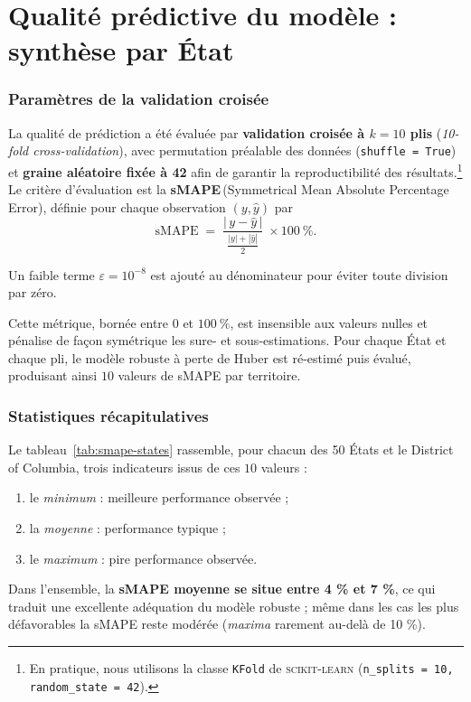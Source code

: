 \section{Qualité prédictive du modèle : synthèse par État}

\subsubsection*{Paramètres de la validation croisée}
La qualité de prédiction a été évaluée par \textbf{validation croisée à $k=10$ plis}
(\emph{10-fold cross-validation}), avec permutation préalable des données
(\texttt{shuffle = True}) et \textbf{graine aléatoire fixée à 42} afin de garantir la
reproductibilité des résultats.\footnote{En pratique, nous utilisons la classe
	\texttt{KFold} de \textsc{scikit-learn} (\texttt{n\_splits = 10,
		random\_state = 42}).}  
Le critère d’évaluation est la
\textbf{sMAPE}\,(Symmetrical Mean Absolute Percentage Error), définie pour
chaque observation $(y, \hat y)$ par
\[
\mathrm{sMAPE} \;=\;
\frac{|\,y - \hat y\,|}{\tfrac{|y| + |\hat y|}{2}}\;\times 100~\%.
\]

Un faible terme $\varepsilon = 10^{-8}$ est ajouté au dénominateur pour éviter toute division par zéro.

Cette métrique, bornée entre $0$ et $100~\%$, est insensible aux valeurs nulles
et pénalise de façon symétrique les sure- et sous-estimations.  Pour chaque
État et chaque pli, le modèle robuste à perte de Huber
est ré-estimé puis évalué, produisant ainsi $10$ valeurs de sMAPE par
territoire.

\subsubsection*{Statistiques récapitulatives}
Le tableau~\ref{tab:smape-states} rassemble, pour chacun des 50 États et le
District of Columbia, trois indicateurs issus de ces $10$ valeurs :

\begin{enumerate}
	\item le \emph{minimum} : meilleure performance observée ;
	\item la \emph{moyenne} : performance typique ;
	\item le \emph{maximum} : pire performance observée.
\end{enumerate}

Dans l’ensemble, la \textbf{sMAPE moyenne se situe entre 4 \% et 7 \%}, ce qui
traduit une excellente adéquation du modèle robuste ; même dans les cas les
plus défavorables la sMAPE reste modérée (\emph{maxima} rarement au-delà de
10 \%).

